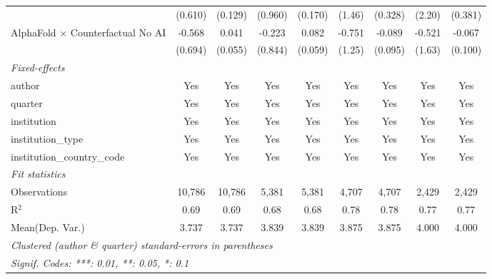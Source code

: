 \begin{tabular}{lcccccccc}
                                            & (0.610)      & (0.129)      & (0.960) & (0.170) & (1.46)  & (0.328) & (2.20)  & (0.381)\\   
   AlphaFold $\times$ Counterfactual No AI  & -0.568       & 0.041        & -0.223  & 0.082   & -0.751  & -0.089  & -0.521  & -0.067\\   
                                            & (0.694)      & (0.055)      & (0.844) & (0.059) & (1.25)  & (0.095) & (1.63)  & (0.100)\\   
   \midrule
   \emph{Fixed-effects}\\
   author                                   & Yes          & Yes          & Yes     & Yes     & Yes     & Yes     & Yes     & Yes\\  
   quarter                                  & Yes          & Yes          & Yes     & Yes     & Yes     & Yes     & Yes     & Yes\\  
   institution                              & Yes          & Yes          & Yes     & Yes     & Yes     & Yes     & Yes     & Yes\\  
   institution\_type                        & Yes          & Yes          & Yes     & Yes     & Yes     & Yes     & Yes     & Yes\\  
   institution\_country\_code               & Yes          & Yes          & Yes     & Yes     & Yes     & Yes     & Yes     & Yes\\  
   \midrule
   \emph{Fit statistics}\\
   Observations                             & 10,786       & 10,786       & 5,381   & 5,381   & 4,707   & 4,707   & 2,429   & 2,429\\  
   R$^2$                                    & 0.69         & 0.69         & 0.68    & 0.68    & 0.78    & 0.78    & 0.77    & 0.77\\  
Mean(Dep. Var.) & 3.737 & 3.737 & 3.839 & 3.839 & 3.875 & 3.875 & 4.000 & 4.000 \\
   \midrule \midrule
   \multicolumn{9}{l}{\emph{Clustered (author \& quarter) standard-errors in parentheses}}\\
   \multicolumn{9}{l}{\emph{Signif. Codes: ***: 0.01, **: 0.05, *: 0.1}}\\
\end{tabular}
\par\endgroup
